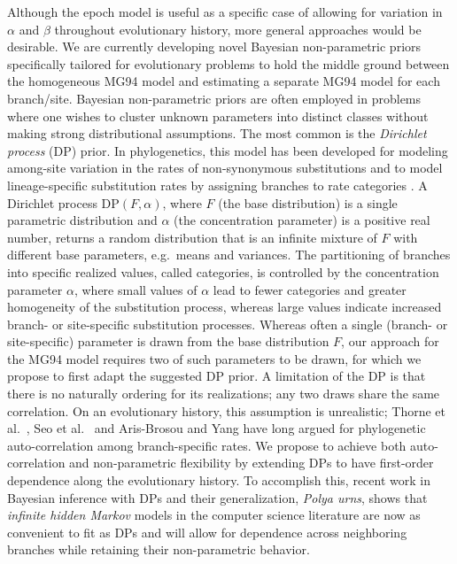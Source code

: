   
Although the epoch model is useful as a specific case of allowing for variation in $\alpha$ and $\beta$ throughout evolutionary history, more general approaches would be desirable.
We are currently developing novel Bayesian non-parametric priors specifically tailored for evolutionary problems to hold the middle ground between the homogeneous MG94 model and estimating a separate MG94 model for each branch/site.
Bayesian non-parametric priors are often employed in problems where one wishes to cluster unknown parameters into distinct classes without making strong distributional assumptions.
The most common is the \emph{Dirichlet process} (DP) prior. 
In phylogenetics, this model has been developed for modeling among-site variation in the rates of non-synonymous substitutions \citep{huelsenbeck06} and to model lineage-specific substitution rates by assigning branches to rate categories \citep{heath2012}.
A Dirichlet process DP$(F, \alpha)$, where $F$ (the base distribution) is a single parametric distribution and $\alpha$ (the concentration parameter) is a positive real number, returns a random distribution that is an infinite mixture of $F$ with different base parameters, e.g.~means and variances.
The partitioning of branches into specific realized values, called categories, is controlled by the concentration parameter $\alpha$, where small values of $\alpha$ lead to fewer categories and greater homogeneity of the substitution process, whereas large values indicate increased branch- or site-specific substitution processes.
Whereas often a single (branch- or site-specific) parameter is drawn from the base distribution $F$, our approach for the MG94 model requires two of such parameters to be drawn, for which we propose to first adapt the suggested DP prior.
A limitation of the DP is that there is no naturally ordering for its realizations; any two draws share the same correlation.  
On an evolutionary history, this assumption is unrealistic; Thorne et al.~\citep{th98}, Seo et al.~\citep{seo04} and Aris-Brosou and Yang \citep{arisbrosou02} have long argued for phylogenetic auto-correlation among branch-specific rates.
We propose to achieve both auto-correlation and non-parametric flexibility by extending DPs to have first-order dependence along the evolutionary history.  
To accomplish this, recent work in Bayesian inference with DPs and their generalization, \emph{Polya urns}, \citep{guha2010posterior} shows that \emph{infinite hidden Markov} models \citep{beal2002infinite}
in the computer science literature are now as convenient to fit as DPs and will allow for dependence across neighboring branches while retaining their non-parametric behavior.

